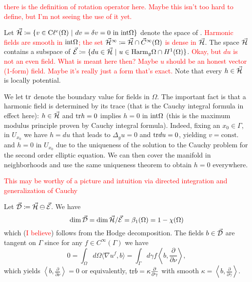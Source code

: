  \textcolor{red}{there is the definition of rotation operator here. Maybe this isn't too hard to define, but I'm not seeing the use of it yet.}
  
  Let $\vec{\mathcal{H}}\coloneqq \{v \in \mathrm{C}\ell^e(\Omega) ~\vert~ dv=\delta v = 0 ~\textrm{in $\mathrm{int} \Omega$}\}$ denote the space of .  \textcolor{red}{Harmonic fields are smooth in $\mathrm{int} \Omega$; the set $\vec{\mathcal{H}}^\infty \coloneqq \vec{\mathcal{H}} \cap \vec{C}^\infty(\Omega)$ is dense in $\vec{\mathcal{H}}$}. The space $\vec{\mathcal{H}}$ contains a subspace of  $\vec{\mathcal{E}} \coloneqq \{d u \in \vec{\mathcal{H}} ~\vert~ u \in \mathrm{Harm}_g\Omega \cap H^1(\Omega)\}$.  \textcolor{red}{Okay, but $d u$ is not an even field.  What is meant here then? Maybe $u$ should be an honest vector (1-form) field. Maybe it's really just a form that's exact.} Note that every $h\in \vec{\mathcal{H}}$ is locally potential.
  
  We let $\mathrm{tr}$ denote the boundary value for fields in $\Omega$.  The important fact is that a harmonic field is determined by its trace (that is the Cauchy integral formula in effect here): $h\in \vec{\mathcal{H}}$ and $\mathrm{tr} h =0$ implies $h=0$ in $\mathrm{int} \Omega$ (this is the maximum modulus principle proven by Cauchy integral formula).  Indeed, fixing an $x_0\in \Gamma$, in $U_{x_0}$ we have $h=d u$ that leads to $\Delta_g u =0$ and $\mathrm{tr} du = 0$, yielding $v=\textrm{const.}$ and $h=0$ in $U_{x_0}$ due to the uniqueness of the solution to the Cauchy problem for the second order elliptic equation. We can then cover the manifold in neighborhoods and use the same uniqueness theorem to obtain $h=0$ everywhere. 
  
  \textcolor{red}{This may be worthy of a picture and intuition via directed integration and generalization of Cauchy}
  
  Let $\vec{\mathcal{D}} \coloneqq \vec{\mathcal{H}} \ominus \vec{\mathcal{E}}$. We have
  \[
  \dim \vec{\mathcal{D}} = \dim \vec{\mathcal{H}} / \vec{\mathcal{E}} = \beta_1 (\Omega)=1-\chi(\Omega)
  \]
  which (\textcolor{red}{I believe}) follows from the Hodge decomposition. The fields $b\in \vec{\mathcal{D}}$ are tangent on $\Gamma$ since for any $f\in C^{\infty}(\Gamma)$ we have
  \[
  0=\int_\Omega d\Omega \langle \nabla u^f,b\rangle = \int_\Gamma d\gamma f \left\langle b,\frac{\partial}{\partial \nu}\right\rangle,
  \]
  which yields $\left\langle b,\frac{\partial}{\partial \nu}\right\rangle=0$ or equivalently, $\mathrm{tr} b = \kappa \frac{\partial}{\partial \gamma}$ with smooth $\kappa = \left\langle b,\frac{\partial}{\partial \gamma}\right\rangle$.
  
